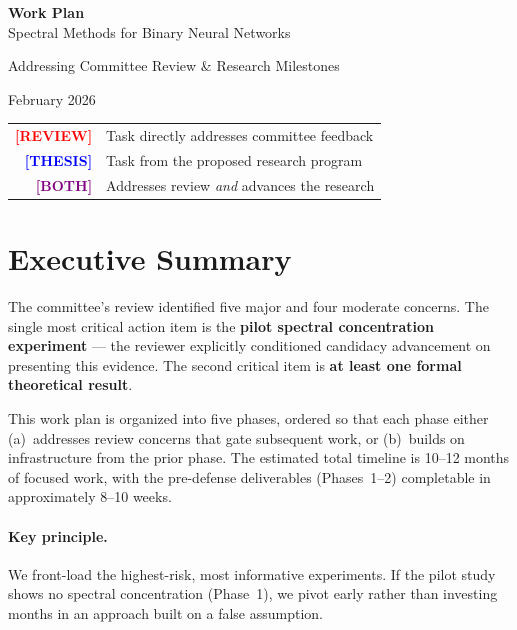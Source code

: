 \documentclass[12pt,a4paper]{article}
\begin{document}
\begin{titlepage}
\centering
\vspace*{3cm}

{\LARGE\bfseries Work Plan}\\[12pt]
{\Large Spectral Methods for Binary Neural Networks}

\vspace{2cm}

{\large Addressing Committee Review \& Research Milestones}

\vspace{1.5cm}

{\large February 2026}

\vspace{3cm}

\begin{tabular}{rl}
\textcolor{red}{\textbf{[REVIEW]}} & Task directly addresses committee feedback \\
\textcolor{blue}{\textbf{[THESIS]}} & Task from the proposed research program \\
\textcolor{purple}{\textbf{[BOTH]}} & Addresses review \emph{and} advances the research \\
\end{tabular}

\end{titlepage}

\tableofcontents
\newpage

\section{Executive Summary}

The committee's review identified five major and four moderate concerns. The single most critical action item is the \textbf{pilot spectral concentration experiment} --- the reviewer explicitly conditioned candidacy advancement on presenting this evidence. The second critical item is \textbf{at least one formal theoretical result}.

This work plan is organized into five phases, ordered so that each phase either (a)~addresses review concerns that gate subsequent work, or (b)~builds on infrastructure from the prior phase. The estimated total timeline is 10--12 months of focused work, with the pre-defense deliverables (Phases~1--2) completable in approximately 8--10 weeks.

\paragraph{Key principle.} We front-load the highest-risk, most informative experiments. If the pilot study shows no spectral concentration (Phase~1), we pivot early rather than investing months in an approach built on a false assumption.
\end{document}
